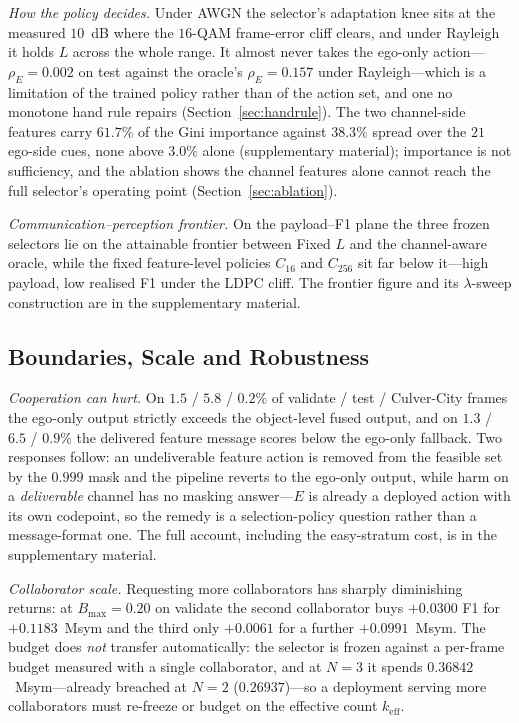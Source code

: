 \documentclass[journal]{IEEEtran}
\begin{document}
\emph{How the policy decides.} Under AWGN the selector's adaptation knee sits at the measured
$10$~dB where the $16$-QAM frame-error cliff clears, and under Rayleigh it holds $L$ across the whole
range. It almost never takes the ego-only action---$\rho_E=0.002$ on test against the oracle's
$\rho_E=0.157$ under Rayleigh---which is a limitation of the trained policy rather than of the action
set, and one no monotone hand rule repairs (Section~\ref{sec:handrule}). The two channel-side features carry $61.7\%$ of the Gini importance against $38.3\%$ spread over the $21$ ego-side cues, none above $3.0\%$ alone (supplementary material); importance is not sufficiency, and the ablation shows the channel features alone cannot reach the full selector's operating point (Section~\ref{sec:ablation}).

\emph{Communication--perception frontier.} On the payload--F1 plane the three frozen selectors lie on
the attainable frontier between Fixed $L$ and the channel-aware oracle, while the fixed feature-level
policies $C_{16}$ and $C_{256}$ sit far below it---high payload, low realised F1 under the LDPC
cliff. The frontier figure and its $\lambda$-sweep construction are in the supplementary material.

\subsection{Boundaries, Scale and Robustness}\label{sec:boundaries}

\emph{Cooperation can hurt.} On $1.5$ / $5.8$ / $0.2\%$ of
validate / test / Culver-City frames the ego-only output strictly exceeds the object-level fused
output, and on $1.3$ / $6.5$ / $0.9\%$ the delivered feature message scores below the ego-only
fallback. Two responses follow: an undeliverable feature action is removed from the feasible set by
the $0.999$ mask and the pipeline reverts to the ego-only output, while harm on a \emph{deliverable}
channel has no masking answer---$E$ is already a deployed action with its own codepoint, so the
remedy is a selection-policy question rather than a message-format one. The full account, including
the easy-stratum cost, is in the supplementary material.

\emph{Collaborator scale.} Requesting more collaborators has sharply diminishing returns: at
$B_{\max}=0.20$ on validate the second collaborator buys $+0.0300$ F1 for $+0.1183$~Msym and the
third only $+0.0061$ for a further $+0.0991$~Msym. The budget does \emph{not} transfer automatically:
the selector is frozen against a per-frame budget measured with a single collaborator, and at $N=3$
it spends $0.36842$~Msym---already breached at $N=2$ ($0.26937$)---so a deployment serving more
collaborators must re-freeze or budget on the effective count $k_{\mathrm{eff}}$.
\end{document}
